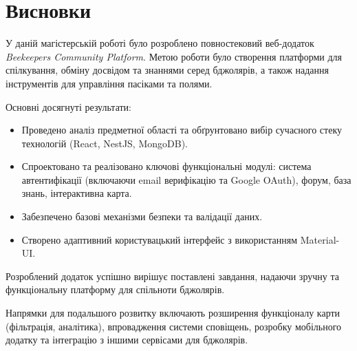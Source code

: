 \chapter*{Висновки}
\label{ch:conclusions}


У даній магістерській роботі було розроблено повностековий веб-додаток \textit{Beekeepers Community Platform}. 
Метою роботи було створення платформи для спілкування, обміну досвідом та знаннями серед бджолярів, а також надання інструментів для управління пасіками та полями.

Основні досягнуті результати:
\begin{itemize}
    \item Проведено аналіз предметної області та обґрунтовано вибір сучасного стеку технологій (React, NestJS, MongoDB).
    \item Спроектовано та реалізовано ключові функціональні модулі: система автентифікації (включаючи email верифікацію та Google OAuth), форум, база знань, інтерактивна карта.
    \item Забезпечено базові механізми безпеки та валідації даних.
    \item Створено адаптивний користувацький інтерфейс з використанням Material-UI.
\end{itemize}

Розроблений додаток успішно вирішує поставлені завдання, надаючи зручну та функціональну платформу для спільноти бджолярів. 

Напрямки для подальшого розвитку включають розширення функціоналу карти (фільтрація, аналітика), впровадження системи сповіщень, розробку мобільного додатку та інтеграцію з іншими сервісами для бджолярів. 